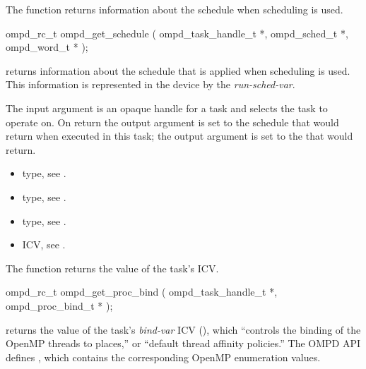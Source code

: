 \label{ompd:ompd_get_schedule}
\summary
The  function returns information about the schedule when  scheduling is used.

\format
\cspecificstart
\begin{boxedcode}
ompd\_rc\_t ompd\_get\_schedule (
  ompd\_task\_handle\_t        *, 
  ompd\_sched\_t              *,
  ompd\_word\_t              *
); 
\end{boxedcode}
\cspecificend

\descr

 returns information about the schedule that is
applied when  scheduling is used.
%
This information is represented in the device by the
\emph{run-sched-var}.

\argdesc
The input argument  is an opaque handle for a task and selects the task to operate on.
On return the output argument  is set to the schedule that  would return when
executed in this task; the output argument  is set to the  that 
 would return.


\crossreferences
\begin{itemize}
	\item {} type, see .
	\item {} type, see .
	\item {} type, see .
	\item {} ICV, see .
\end{itemize}


%
\label{ompd:ompd_get_proc_bind}
\summary
The  function returns the value of the task's  ICV.

\format
\cspecificstart
\begin{boxedcode}
ompd\_rc\_t ompd\_get\_proc\_bind (
  ompd\_task\_handle\_t        *, 
  ompd\_proc\_bind\_t          *
); 
\end{boxedcode}
\cspecificend

\descr
{} returns the value of the task's
\emph{bind-var} ICV (), which ``controls the
binding of the OpenMP threads to places,'' or ``default thread
affinity policies.''
%
The OMPD API defines
, which
contains the corresponding OpenMP enumeration values.
%

